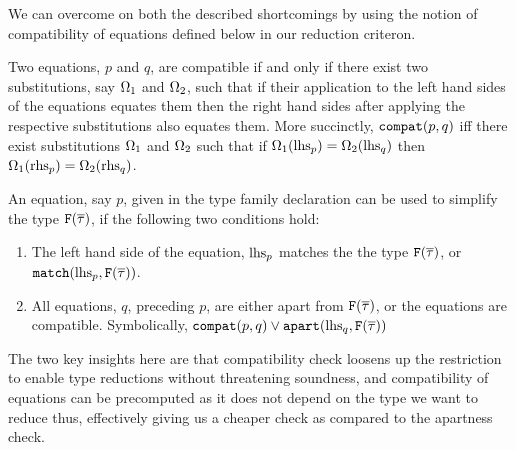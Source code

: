 \documentclass[format=acmsmall,manuscript,review,screen,nonacm,margin=1in,11pt]{acmart}
\begin{document}
We can overcome on both the described shortcomings by using the notion of compatibility of equations defined below in
our reduction criteron.
\begin{defn}\label{def:compact-eqns}
  Two equations, $p$ and $q$, are compatible   if and only if there exist two substitutions,
  say $\Omega_1$ and $\Omega_2$, such that if their application to the left hand sides of the equations
  equates them then the right hand sides after applying the respective substitutions also equates them.
  More succinctly, $\texttt{compat}(p, q)$ iff there exist substitutions $\Omega_1$ and $\Omega_2 $
  such that if $\Omega_1(\text{lhs}_{p}) = \Omega_2(\text{lhs}_{q})$ then $\Omega_1(\text{rhs}_{p}) = \Omega_2(\text{rhs}_{q})$.
\end{defn}
\begin{defn}\label{def:ctf-simpl}
  An equation, say $p$, given in the type family declaration can be used to simplify the type
  $\texttt{F}(\overline{\tau})$, if the following two conditions hold:
  \begin{enumerate}
  \item The left hand side of the equation, $\text{lhs}_{p}$  matches the the type $\texttt{F}(\overline{\tau})$,
    or $\texttt{match}(\text{lhs}_{p}, \texttt{F}(\overline{\tau}))$.
  \item All equations, $q$, preceding $p$, are either apart from $\texttt{F}(\overline{\tau})$, or
    the equations are compatible. Symbolically, $\texttt{compat}(p, q) \lor \texttt{apart}(\text{lhs}_{q}, \texttt{F}(\overline{\tau}))$
  \end{enumerate}
\end{defn}
The two key insights here are that compatibility check loosens up the restriction
to enable type reductions without threatening soundness, and compatibility of equations
can be precomputed as it does not depend on the type we want to reduce
thus, effectively giving us a cheaper check as compared to the apartness check.
\end{document}
